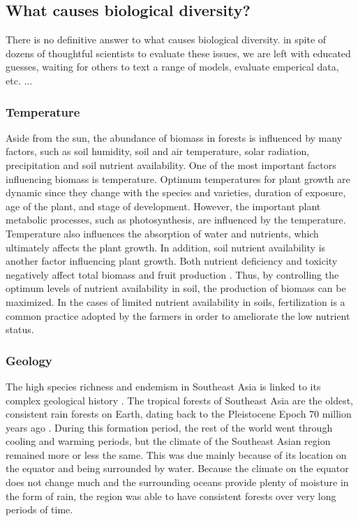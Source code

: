 \subsection{What causes biological diversity?}

There is no definitive answer to what causes biological diversity. in spite of dozens of thoughtful scientists to evaluate these issues, we are left with educated guesses, waiting for others to text a range of models, evaluate emperical data, etc. ...

\subsubsection{Temperature}
	Aside from the sun, the abundance of biomass in forests is influenced by many factors, such as soil humidity, soil and air temperature, solar radiation, precipitation and soil nutrient availability. One of the most important factors influencing biomass is temperature. Optimum temperatures for plant growth are dynamic since they change with the species and varieties, duration of exposure, age of the plant, and stage of development\citep{marshall1988environmental}. However, the important plant metabolic processes, such as photosynthesis, are influenced by the temperature. Temperature also influences the absorption of water and nutrients, which ultimately affects the plant growth. In addition, soil nutrient availability is another factor influencing plant growth. Both nutrient deficiency and toxicity negatively affect total biomass and fruit production \citep{chatzistathis2013soil}. Thus, by controlling the optimum levels of nutrient availability in soil, the production of biomass can be maximized. In the cases of limited nutrient availability in soils, fertilization is a common practice adopted by the farmers in order to ameliorate the low nutrient status. 

\subsubsection{Geology}
	The high species richness and endemism in Southeast Asia is linked to its complex geological history \citep{sodhi2004southeast}. The tropical forests of Southeast Asia are the oldest, consistent rain forests on Earth, dating back to the Pleistocene Epoch 70 million years ago \cite{hutchison1989geological}. During this formation period, the rest of the world went through cooling and warming periods, but the climate of the Southeast Asian region remained more or less the same. This was due mainly because of its location on the equator and being surrounded by water. Because the climate on the equator does not change much and the surrounding oceans provide plenty of moisture in the form of rain, the region was able to have consistent forests over very long periods of time. 


